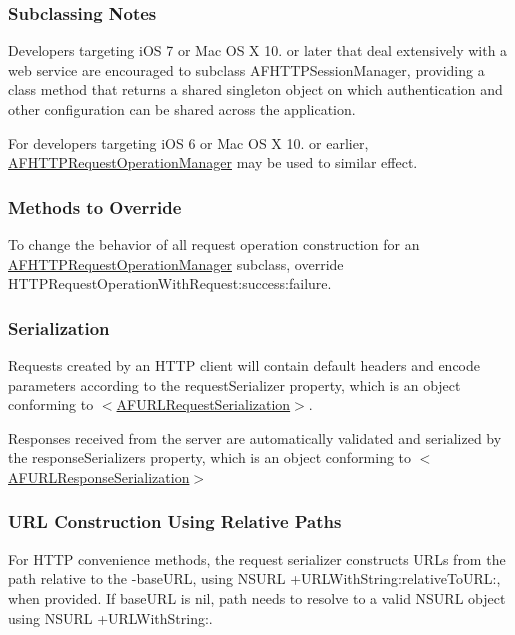 \subsubsection*{Subclassing Notes}

Developers targeting i\+O\+S 7 or Mac O\+S X 10. or later that deal extensively with a web service are encouraged to subclass {\ttfamily A\+F\+H\+T\+T\+P\+Session\+Manager}, providing a class method that returns a shared singleton object on which authentication and other configuration can be shared across the application.

For developers targeting i\+O\+S 6 or Mac O\+S X 10. or earlier, {\ttfamily \hyperlink{interface_a_f_h_t_t_p_request_operation_manager}{A\+F\+H\+T\+T\+P\+Request\+Operation\+Manager}} may be used to similar effect.

\subsubsection*{Methods to Override}

To change the behavior of all request operation construction for an {\ttfamily \hyperlink{interface_a_f_h_t_t_p_request_operation_manager}{A\+F\+H\+T\+T\+P\+Request\+Operation\+Manager}} subclass, override {\ttfamily H\+T\+T\+P\+Request\+Operation\+With\+Request\+:success\+:failure}.

\subsubsection*{Serialization}

Requests created by an H\+T\+T\+P client will contain default headers and encode parameters according to the {\ttfamily request\+Serializer} property, which is an object conforming to {\ttfamily $<$\hyperlink{protocol_a_f_u_r_l_request_serialization-p}{A\+F\+U\+R\+L\+Request\+Serialization}$>$}.

Responses received from the server are automatically validated and serialized by the {\ttfamily response\+Serializers} property, which is an object conforming to {\ttfamily $<$\hyperlink{protocol_a_f_u_r_l_response_serialization-p}{A\+F\+U\+R\+L\+Response\+Serialization}$>$}

\subsubsection*{U\+R\+L Construction Using Relative Paths}

For H\+T\+T\+P convenience methods, the request serializer constructs U\+R\+Ls from the path relative to the {\ttfamily -\/base\+U\+R\+L}, using {\ttfamily N\+S\+U\+R\+L +\+U\+R\+L\+With\+String\+:relative\+To\+U\+R\+L\+:}, when provided. If {\ttfamily base\+U\+R\+L} is {\ttfamily nil}, {\ttfamily path} needs to resolve to a valid {\ttfamily N\+S\+U\+R\+L} object using {\ttfamily N\+S\+U\+R\+L +\+U\+R\+L\+With\+String\+:}.

